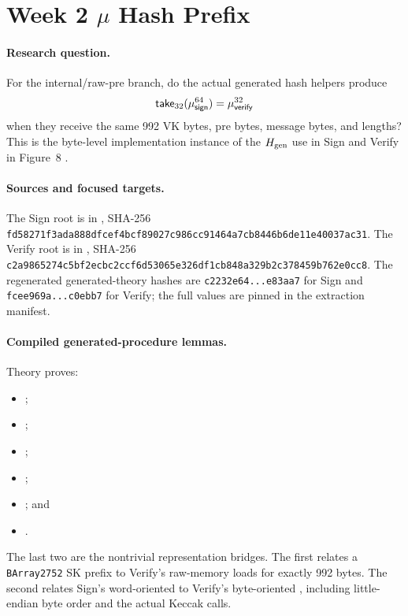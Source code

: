 \section{Week 2 \texorpdfstring{$\mu$}{mu} Hash Prefix}
\label{sec:week2-mu}

\paragraph{Research question.}
For the internal/raw-pre branch, do the actual generated hash helpers produce
\[
  \mathsf{take}_{32}(\mu_{\mathsf{sign}}^{64})
  = \mu_{\mathsf{verify}}^{32}
\]
when they receive the same 992 VK bytes, pre bytes, message bytes, and
lengths? This is the byte-level implementation instance of the \(H_{\rm gen}\)
use in Sign and Verify in Figure~8 \cite{haetae-pdf}.

\paragraph{Sources and focused targets.}
The Sign root is  in , SHA-256
\texttt{fd58271f3ada888dfcef4bcf89027c986cc91464a7cb8446b6de11e40037ac31}.
The Verify root is  in
, SHA-256
\texttt{c2a9865274c5bf2ecbc2ccf6d53065e326df1cb848a329b2c378459b762e0cc8}.
The regenerated generated-theory hashes are
\texttt{c2232e64...e83aa7} for Sign and
\texttt{fcee969a...c0ebb7} for Verify; the full values are pinned in the
extraction manifest.

\paragraph{Compiled generated-procedure lemmas.}
Theory  proves:
\begin{itemize}
  \item {};
  \item {};
  \item {};
  \item {};
  \item {}; and
  \item {}.
\end{itemize}
The last two are the nontrivial representation bridges. The first relates a
\texttt{BArray2752} SK prefix to Verify's raw-memory loads for exactly 992
bytes. The second relates Sign's word-oriented
 to Verify's byte-oriented
, including little-endian byte
order and the actual Keccak calls.

